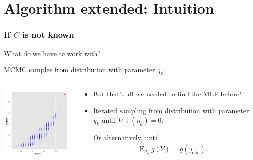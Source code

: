 \documentclass[ 10pt]{beamer}
\DeclareMathOperator{\E}{E}
\newcommand{\etaLCM}{\hat{\eta}_{\textrm{LCM}}}
\newcommand{\yobs}{y_{\text{obs}}}
\begin{document}
\section{Algorithm extended: Intuition}
\frame
{
\frametitle{If $C$ is not known}
What do we have to work with?
\vspace{4mm}

\pause
MCMC samples from distribution with parameter $\eta_k$.  

\vspace{1ex}

\begin{columns}[t]
\begin{column}[T]{0.4\textwidth}
\includegraphics[width=2in]{MCsample-bare}
\end{column}

\begin{column}[r]{0.6\textwidth}
\pause

\begin{itemize}
\item But that's all we needed to find the MLE before! 


\item Iterated sampling from distribution with parameter $\eta_k$ until $\nabla \ell(\eta_k) = 0$.
\vspace{1mm}

Or alternatively, until
\begin{align*}
	\E_{\eta_k} g(Y) = g(\yobs).
\end{align*}

\end{itemize}
\end{column}
\end{columns}
}
\end{document}
